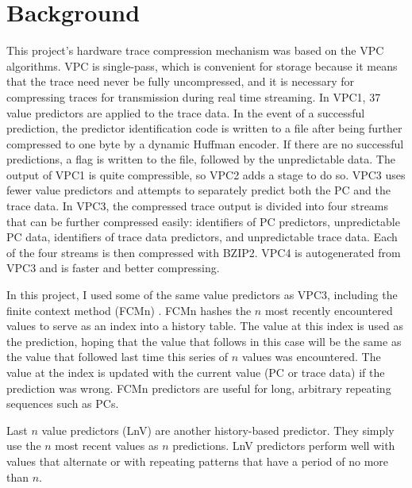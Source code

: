 \documentclass[conference]{IEEEtran}
\begin{document}
\section{Background}  
This project's hardware trace compression mechanism was based on the VPC algorithms. VPC is single-pass, which is convenient for storage because it means that the trace need never be fully uncompressed, and it is necessary for compressing traces for transmission during real time streaming. In VPC1, 37 value predictors are applied to the trace data. In the event of a successful prediction, the predictor identification code is written to a file after being further compressed to one byte by a dynamic Huffman encoder. If there are no successful predictions, a flag is written to the file, followed by the unpredictable data. The output of VPC1 is quite compressible, so VPC2 adds a stage to do so. VPC3 uses fewer value predictors and attempts to separately predict both the PC and the trace data. In VPC3, the compressed trace output is divided into four streams that can be further compressed easily: identifiers of PC predictors, unpredictable PC data, identifiers of trace data predictors, and unpredictable trace data. Each of the four streams is then compressed with BZIP2. VPC4 is autogenerated from VPC3 and is faster and better compressing.

In this project, I used some of the same value predictors as VPC3, including the finite context method (FCMn) \cite{sazeides1997}. FCMn hashes the $n$ most recently encountered values to serve as an index into a history table. The value at this index is used as the prediction, hoping that the value that follows in this case will be the same as the value that followed last time this series of $n$ values was encountered. The value at the index is updated with the current value (PC or trace data) if the prediction was wrong. FCMn predictors are useful for long, arbitrary repeating sequences such as PCs. 

Last $n$ value predictors (LnV) \cite{burtscher1999} are another history-based predictor. They simply use the $n$ most recent values as $n$ predictions. LnV predictors perform well with values that alternate or with repeating patterns that have a period of no more than $n$. 
\end{document}
